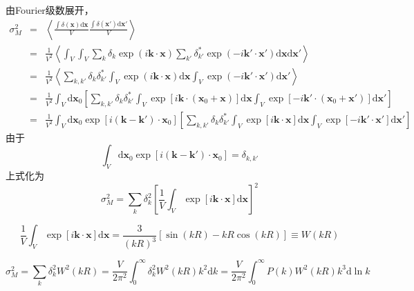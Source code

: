 \documentclass[12pt,a4paper]{article}
\renewcommand{\vec}[1]{\boldsymbol{#1}}
\newcommand{\dif}{\mathrm{d}}
\begin{document}
由Fourier级数展开，
\begin{eqnarray}
\nonumber \sigma_M^2 &=& \left\langle \frac{\int \delta(\vec{x}) \dif \vec{x} }{V} \frac{\int \delta(\vec{x}') \dif \vec{x}' }{V} \right\rangle \\
\nonumber &=& \frac{1}{V^2}  \left\langle \int_V \int_V \sum_k \delta_k \exp (i\vec{k}\cdot \vec{x}) \sum_{k'} \delta^*_{k'} \exp (-i\vec{k'}\cdot \vec{x'}) \dif \vec{x} \dif \vec{x}' \right\rangle \\
\nonumber &=& \frac{1}{V^2}  \left\langle \sum_{k,k'} \delta_k \delta^*_{k'}  \int_V \exp (i\vec{k}\cdot \vec{x}) \dif \vec{x} \int_V \exp (-i\vec{k'}\cdot \vec{x'}) \dif \vec{x}' \right\rangle \\
\nonumber &=& \frac{1}{V^2} \int_V \dif \vec{x}_0 \left[ \sum_{k,k'} \delta_k \delta^*_{k'}  \int_V \exp [i\vec{k}\cdot (\vec{x}_0 +\vec{x})] \dif \vec{x} \int_V \exp [-i\vec{k'}\cdot (\vec{x}_0 +\vec{x'})] \dif \vec{x}'  \right] \\
\nonumber &=& \frac{1}{V^2} \int_V \dif \vec{x}_0 \exp [i(\vec{k}-\vec{k'})\cdot \vec{x}_0] \left[ \sum_{k,k'} \delta_k \delta^*_{k'}  \int_V \exp [i\vec{k}\cdot \vec{x}] \dif \vec{x} \int_V \exp [-i\vec{k'}\cdot \vec{x'}] \dif \vec{x}'  \right]
\end{eqnarray}
由于
\begin{equation}
\int_V \dif \vec{x}_0 \exp [i(\vec{k}-\vec{k'})\cdot \vec{x}_0]  = \delta_{k,k'}
\end{equation}
上式化为
\begin{equation}
\sigma_M^2 = \sum_k \delta^2_k \left[ \frac{1}{V} \int_V \exp [i\vec{k}\cdot \vec{x}] \dif \vec{x} \right]^2
\end{equation}

\begin{equation}
\frac{1}{V} \int_V \exp [i\vec{k}\cdot \vec{x}] \dif \vec{x} = \frac{3}{(kR)^3} [\sin(kR) -kR\cos(kR)] \equiv W(kR)
\end{equation}

\begin{equation}
\sigma_M^2 = \sum_k \delta^2_k W^2(kR) = \frac{V}{2\pi^2} \int_0^{\infty} \delta^2_k W^2(kR) k^2 \dif k = \frac{V}{2\pi^2} \int_0^{\infty} P(k) W^2(kR) k^3 \dif \ln k 
\end{equation}
























\end{document}

